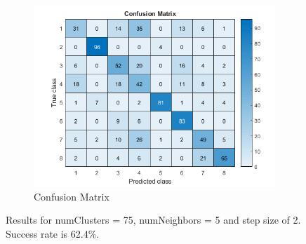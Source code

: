 \begin{figure}[h]
\begin{subfigure}{0.3\textwidth}
	\end{subfigure}
	\begin{subfigure}{0.65\textwidth}
		\includegraphics[width=\textwidth]{figures/confusion_75C_5NN_2S.png}
		\caption{Confusion Matrix}
	\end{subfigure}
	\caption{Results for numClusters = 75, numNeighbors = 5 and step size of 2. Success rate is 62.4\%.}
	\label{fig:a5:75c5nn2s}
\end{figure}

